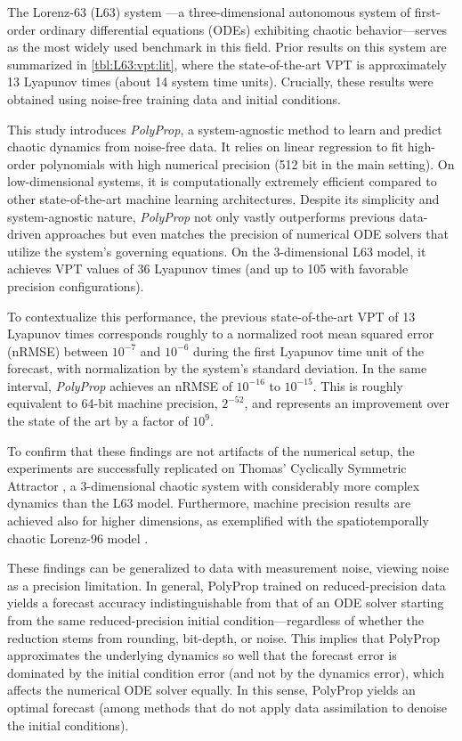 \documentclass{article}
\begin{document}
The Lorenz-63 (L63) system \citep{Lorenz1963}---a three-dimensional autonomous system of first-order ordinary differential equations (ODEs) exhibiting chaotic behavior---serves as the most widely used benchmark in this field. 
Prior results on this system are summarized in \cref{tbl:L63:vpt:lit}, where the state-of-the-art VPT is approximately 13 Lyapunov times (about 14 system time units). Crucially, these results were obtained using noise-free training data and initial conditions.

This study introduces \textit{PolyProp}, a system-agnostic method to learn and predict chaotic dynamics from noise-free data. It relies on linear regression to fit high-order polynomials with high numerical precision (512 bit in the main setting). On low-dimensional systems, it is computationally extremely efficient compared to other state-of-the-art machine learning architectures. Despite its simplicity and system-agnostic nature, \textit{PolyProp} not only vastly outperforms previous data-driven approaches but even matches the precision of numerical ODE solvers that utilize the system's governing equations. On the 3-dimensional L63 model, it achieves VPT values of 36 Lyapunov times (and up to 105 with favorable precision configurations). 

To contextualize this performance, the previous state-of-the-art VPT of 13 Lyapunov times corresponds roughly to a normalized root mean squared error (nRMSE) between $10^{-7}$ and $10^{-6}$ during the first Lyapunov time unit of the forecast, with normalization by the system's standard deviation. In the same interval, \textit{PolyProp} achieves an nRMSE of $10^{-16}$ to $10^{-15}$. This is roughly equivalent to 64-bit machine precision, $2^{-52}$, and represents an improvement over the state of the art by a factor of $10^9$.

To confirm that these findings are not artifacts of the numerical setup, the experiments are successfully replicated on Thomas' Cyclically Symmetric Attractor \citep{Thomas99}, a 3-dimensional chaotic system with considerably more complex dynamics than the L63 model. Furthermore, machine precision results are achieved also for higher dimensions, as exemplified with the spatiotemporally chaotic Lorenz-96 model \citep{Lorenz1996}.

These findings can be generalized to data with measurement noise, viewing noise as a precision limitation. In general, PolyProp trained on reduced-precision data yields a forecast accuracy indistinguishable from that of an ODE solver starting from the same reduced-precision initial condition---regardless of whether the reduction stems from rounding, bit-depth, or noise. This implies that PolyProp approximates the underlying dynamics so well that the forecast error is dominated by the initial condition error (and not by the dynamics error), which affects the numerical ODE solver equally. In this sense, PolyProp yields an optimal forecast (among methods that do not apply data assimilation to denoise the initial conditions).
\end{document}
